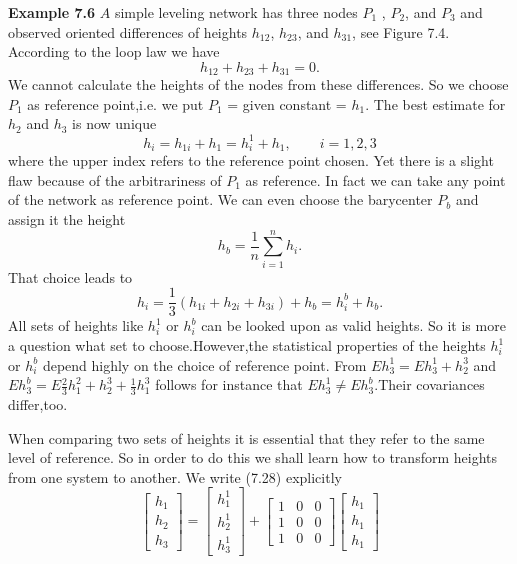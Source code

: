 \textbf{Example 7.6} $A$ simple leveling network has three nodes $P_1$ , $P_2$, and $P_3$ and observed oriented differences of heights $h_{12}$, $h_{23}$, and $h_{31}$, see Figure 7.4. According to the loop law we have
\begin{equation}
h_{12} + h_{23} + h_{31} = 0.
\end{equation}
We cannot calculate the heights of the nodes from these differences. So we choose $P_1$ as
reference point,i.e. we put $P_1$ = given constant = $h_1$. The best estimate for $h_2$ and $h_3$ is now unique
\begin{equation}
h_{i} = h_{1i} + h_{1} = h_{i}^{1} + h_1,\qquad i = 1,2,3
\end{equation}
where the upper index refers to the reference point chosen. Yet there is a slight flaw because
of the arbitrariness of $P_1$ as reference. In fact we can take any point of the network as
reference point. We can even choose the barycenter $P_b$ and assign it the height
\begin{equation*}
h_{b} = \frac{1}{n}\sum_{i = 1}^{n}h_i.
\end{equation*}
That choice leads to
\begin{equation*}
h_{i} = \frac{1}{3}(h_{1i} + h_{2i} + h_{3i}) + h_b = h_{i}^{b} + h_b.
\end{equation*}
All sets of heights like $h_{i}^{1}$ or $h_{i}^{b}$ can be looked upon as valid heights. So it is more a question what set to choose.However,the statistical properties of the heights $h_{i}^{1}$ or $h_{i}^{b}$ depend highly on the choice of reference point. From $E{h_{3}^{1}} = E{h_{3}^{1} + h_{2}^{3}}$ and $E{h_{3}^{b}} = E{\frac{2}{3}h_{1}^{2} + h_{2}^{3} + \frac{1}{3}h_{1}^{3}}$ follows for instance that $E{h_{3}^{1}} \neq E{h_{3}^{b}}$.Their covariances differ,too.
\par
When comparing two sets of heights it is essential that they refer to the same level of
reference. So in order to do this we shall learn how to transform heights from one system
to another. We write (7.28) explicitly
\begin{equation}
\begin{bmatrix}
h_{1}\\
h_{2}\\
h_{3}
\end{bmatrix}
= \begin{bmatrix}
h_{1}^{1}\\
h_{2}^{1}\\
h_{3}^{1}
\end{bmatrix}
+ \begin{bmatrix}
1 & 0 & 0\\
1 & 0 & 0\\
1 & 0 & 0
\end{bmatrix}
\begin{bmatrix}
h_{1}\\
h_{1}\\
h_{1}
\end{bmatrix}
\end{equation}
